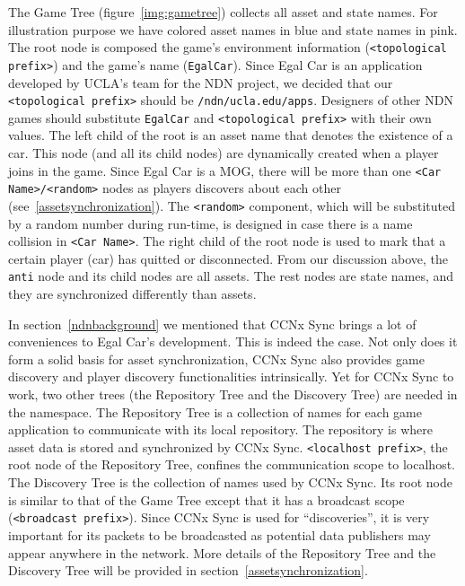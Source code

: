 \documentclass{article}
\begin{document}
The Game Tree (figure~\ref{img:gametree}) collects all asset and state names. For illustration purpose we have colored asset names in blue and state names in pink. The root node is composed the game's environment information (\texttt{<topological prefix>}) and the game's name (\texttt{EgalCar}). Since Egal Car is an application developed by UCLA's team for the NDN project, we decided that our \texttt{<topological prefix>} should be \texttt{/ndn/ucla.edu/apps}. Designers of other NDN games should substitute \texttt{EgalCar} and \texttt{<topological prefix>} with their own values. The left child of the root is an asset name that denotes the existence of a car. This node (and all its child nodes) are dynamically created when a player joins in the game. Since Egal Car is a MOG, there will be more than one \texttt{<Car Name>/<random>} nodes as players discovers about each other (see~\ref{assetsynchronization}). The \texttt{<random>} component, which will be substituted by a random number during run-time, is designed in case there is a name collision in \texttt{<Car Name>}. The right child of the root node is used to mark that a certain player (car) has quitted or disconnected. From our discussion above, the \texttt{anti} node and its child nodes are all assets. The rest nodes are state names, and they are synchronized differently than assets.

In section~\ref{ndnbackground} we mentioned that CCNx Sync brings a lot of conveniences to Egal Car's development. This is indeed the case. Not only does it form a solid basis for asset synchronization, CCNx Sync also provides game discovery and player discovery functionalities intrinsically. Yet for CCNx Sync to work, two other trees (the Repository Tree and the Discovery Tree) are needed in the namespace. The Repository Tree is a collection of names for each game application to communicate with its local repository. The repository is where asset data is stored and synchronized by CCNx Sync. \texttt{<localhost prefix>}, the root node of the Repository Tree, confines the communication scope to localhost. The Discovery Tree is the collection of names used by CCNx Sync. Its root node is similar to that of the Game Tree except that it has a broadcast scope (\texttt{<broadcast prefix>}). Since CCNx Sync is used for ``discoveries'', it is very important for its packets to be broadcasted as potential data publishers may appear anywhere in the network. More details of the Repository Tree and the Discovery Tree will be provided in section~\ref{assetsynchronization}.
\end{document}

